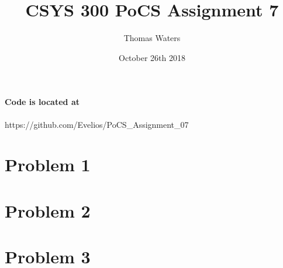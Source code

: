\documentclass{article}
\title{CSYS 300 PoCS Assignment 7}
\author{Thomas Waters}
\date{October 26th 2018}
\begin{document}
\maketitle

\paragraph{Code is located at}
https://github.com/Evelios/PoCS\_Assignment\_07

\break

\section{Problem 1}


\section{Problem 2}


\section{Problem 3}

\end{document}
